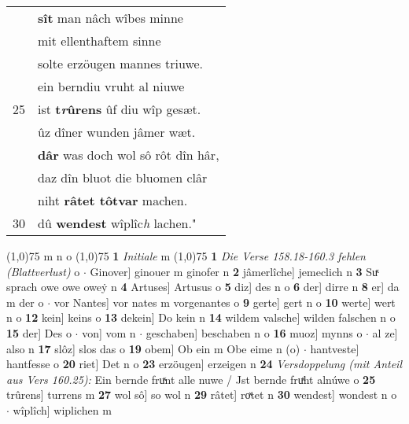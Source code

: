 \documentclass[8pt,a4paper,notitlepage]{article}
\begin{document}
\begin{table}[ht]
\begin{minipage}[t]{0.5\linewidth}
\begin{tabular}{rl}
 & \textbf{sît} man nâch wîbes minne\\ 
 & mit ellenthaftem sinne\\ 
 & solte erzöugen mannes triuwe.\\ 
 & ein berndiu vruht al niuwe\\ 
25 & ist \textbf{t\textit{r}ûrens} ûf diu wîp gesæt.\\ 
 & ûz dîner wunden jâmer wæt.\\ 
 & \textbf{dâr} was doch wol sô rôt dîn hâr,\\ 
 & daz dîn bluot die bluomen clâr\\ 
 & niht \textbf{râtet tôtvar} machen.\\ 
30 & dû \textbf{wendest} wîplîc\textit{h} lachen."\\ 
\end{tabular}
\scriptsize
\line(1,0){75} \newline
m n o \newline
\line(1,0){75} \newline
\textbf{1} \textit{Initiale} m  \newline
\line(1,0){75} \newline
\textbf{1} \textit{Die Verse 158.18-160.3 fehlen (Blattverlust)} o   $\cdot$ Ginover] ginouer m ginofer n \textbf{2} jâmerlîche] jemeclich n \textbf{3} Suͯ sprach owe owe oweẏ n \textbf{4} Artuses] Artusus o \textbf{5} diz] des n o \textbf{6} der] dirre n \textbf{8} er] da m der o  $\cdot$ vor Nantes] vor nates m vorgenantes o \textbf{9} gerte] gert n o \textbf{10} werte] wert n o \textbf{12} kein] keins o \textbf{13} dekein] Do kein n \textbf{14} wildem valsche] wilden falschen n o \textbf{15} der] Des o  $\cdot$ von] vom n  $\cdot$ geschaben] beschaben n o \textbf{16} muoz] mynns o  $\cdot$ al ze] also n \textbf{17} slôz] slos das o \textbf{19} obem] Ob ein m Obe eime n (o)  $\cdot$ hantveste] hantfesse o \textbf{20} riet] Det n o \textbf{23} erzöugen] erzeigen n \textbf{24} \textit{Versdoppelung (mit Anteil aus Vers 160.25):} Ein bernde fruͯnt alle nuwe / Jst bernde fruͯht alnúwe o  \textbf{25} trûrens] turrens m \textbf{27} wol sô] so wol n \textbf{29} râtet] roͯtet n \textbf{30} wendest] wondest n o  $\cdot$ wîplîch] wiplichen m \newline
\end{minipage}
\end{table}
\newpage
\end{document}
